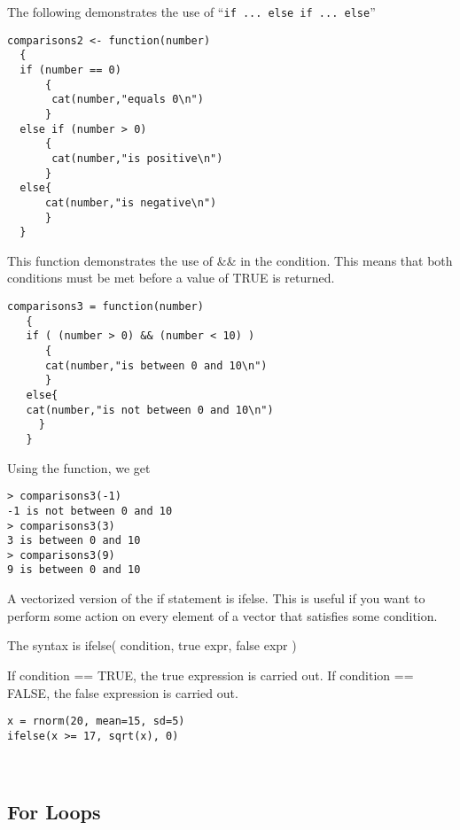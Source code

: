 The following demonstrates the use of “\texttt{if ... else if ... else}”

\begin{verbatim}
comparisons2 <- function(number)
  {
  if (number == 0)
      {
       cat(number,"equals 0\n")
      }
  else if (number > 0)
      {
       cat(number,"is positive\n")
      }
  else{
      cat(number,"is negative\n")
      }
  }
 \end{verbatim}


This function demonstrates the use of && in the condition. This means that both conditions must be met before a value of TRUE is returned.



\begin{framed}
\begin{verbatim}
comparisons3 = function(number)
   {
   if ( (number > 0) && (number < 10) )
      {
      cat(number,"is between 0 and 10\n")
      }
   else{
   cat(number,"is not between 0 and 10\n")
     }
   }
\end{verbatim}
\end{framed}


Using the function, we get
\begin{verbatim}
> comparisons3(-1)
-1 is not between 0 and 10
> comparisons3(3)
3 is between 0 and 10
> comparisons3(9)
9 is between 0 and 10
\end{verbatim}
A vectorized version of the if statement is ifelse. This is useful if you want to perform some action on every element of a vector that satisfies some condition.

The syntax is
ifelse( condition, true expr, false expr )

If condition == TRUE, the true expression is carried out. 
If condition == FALSE, the false expression is carried out.
\begin{verbatim}
x = rnorm(20, mean=15, sd=5)
ifelse(x >= 17, sqrt(x), 0)
\end{verbatim}


 
\subsection{For Loops}

